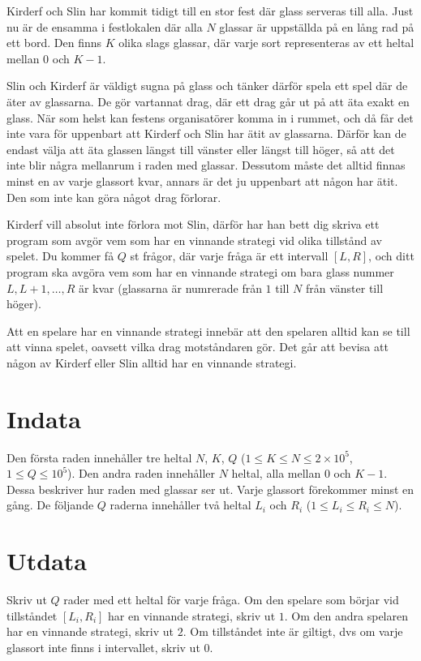 Kirderf och Slin har kommit tidigt till en stor fest där glass serveras till alla.
Just nu är de ensamma i festlokalen där alla $N$ glassar är uppställda på en lång rad på ett bord.
Den finns $K$ olika slags glassar, där varje sort representeras av ett heltal mellan $0$ och $K-1$.

Slin och Kirderf är väldigt sugna på glass och tänker därför spela ett spel där de äter av glassarna.
De gör vartannat drag, där ett drag går ut på att äta exakt en glass.
När som helst kan festens organisatörer komma in i rummet, och då får det inte vara för
uppenbart att Kirderf och Slin har ätit av glassarna. Därför kan de endast välja att
äta glassen längst till vänster eller längst till höger, så att det inte blir några mellanrum
i raden med glassar. Dessutom måste det alltid finnas minst en av varje glassort kvar,
annars är det ju uppenbart att någon har ätit. Den som inte kan göra något drag förlorar.

Kirderf vill absolut inte förlora mot Slin, därför har han bett dig skriva ett program som avgör vem som har en vinnande
strategi vid olika tillstånd av spelet. Du kommer få $Q$ st frågor, där varje fråga är ett intervall $[L,R]$, och 
ditt program ska avgöra vem som har en vinnande strategi om bara glass nummer $L, L+1, \dots, R$ är kvar (glassarna
är numrerade från $1$ till $N$ från vänster till höger).

Att en spelare har en vinnande strategi innebär att den spelaren alltid kan se till att vinna spelet,
oavsett vilka drag motståndaren gör. Det går att bevisa att någon av Kirderf eller Slin alltid har en vinnande strategi.

\section*{Indata}
Den första raden innehåller tre heltal $N$, $K$, $Q$ ($1 \le K \le N \le 2 \times 10^5$, $1 \le Q \le 10^5$).
Den andra raden innehåller $N$ heltal, alla mellan $0$ och $K-1$.
Dessa beskriver hur raden med glassar ser ut. Varje glassort förekommer minst en gång.
De följande $Q$ raderna innehåller två heltal $L_i$ och $R_i$ ($1 \le L_i \le R_i \le N$).


\section*{Utdata}
Skriv ut $Q$ rader med ett heltal för varje fråga. Om den spelare som börjar vid tillståndet $[L_i, R_i]$ har en 
vinnande strategi, skriv ut $1$. Om den andra spelaren har en vinnande strategi, skriv ut $2$. Om tillståndet inte 
är giltigt, dvs om varje glassort inte finns i intervallet, skriv ut $0$.

